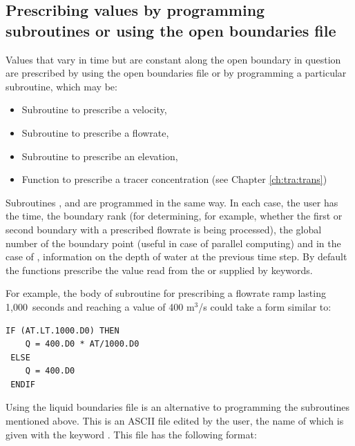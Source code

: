 \subsection{Prescribing values by programming subroutines or using the open boundaries file}
\label{subs:val:funct:bf}
Values that vary in time but are constant along the open boundary in question
are prescribed by using the open boundaries file or by programming a particular
subroutine, which may be:

\begin{itemize}
\item Subroutine  to prescribe a velocity,

\item Subroutine  to prescribe a flowrate,

\item Subroutine  to prescribe an elevation,

\item Function  to prescribe a tracer concentration
(see Chapter \ref{ch:tra:trans})
\end{itemize}

Subroutines ,  and  are
programmed in the same way.
In each case, the user has the time, the boundary rank (for determining,
for example, whether the first or second boundary with a prescribed flowrate
is being processed),
the global number of the boundary point (useful in case of parallel computing)
and in the case of , information on the depth of water
at the previous time step.
By default the functions prescribe the value read from
the  or supplied by keywords.

For example, the body of subroutine  for prescribing a flowrate
ramp lasting 1,000~seconds and reaching a value of 400 m$^3$/s could take
a form similar to:
\begin{lstlisting}[language=TelFortran]
 IF (AT.LT.1000.D0) THEN
    Q = 400.D0 * AT/1000.D0
 ELSE
    Q = 400.D0
 ENDIF
\end{lstlisting}
Using the liquid boundaries file is an alternative to programming the subroutines
mentioned above.
This is an ASCII file edited by the user, the name of which is given with the
keyword .
This file has the following format:

